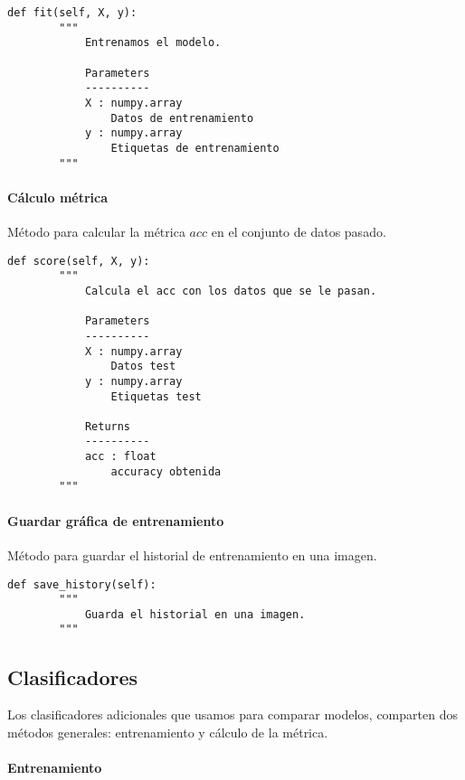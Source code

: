 \begin{lstlisting}
def fit(self, X, y):
        """
            Entrenamos el modelo.

            Parameters
            ----------
            X : numpy.array
                Datos de entrenamiento
            y : numpy.array
                Etiquetas de entrenamiento
        """
\end{lstlisting}

\paragraph{Cálculo métrica}

Método para calcular la métrica $acc$ en el conjunto de datos pasado.

\begin{lstlisting}
def score(self, X, y):
        """
            Calcula el acc con los datos que se le pasan.

            Parameters
            ----------
            X : numpy.array
                Datos test
            y : numpy.array
                Etiquetas test

            Returns
            ----------
            acc : float
                accuracy obtenida
        """
\end{lstlisting}

\paragraph{Guardar gráfica de entrenamiento}

Método para guardar el historial de entrenamiento en una imagen.

\begin{lstlisting}
def save_history(self):
        """
            Guarda el historial en una imagen.
        """
\end{lstlisting}

\subsection{Clasificadores}

Los clasificadores adicionales que usamos para comparar modelos, comparten dos métodos generales: entrenamiento y cálculo de la métrica.

\paragraph{Entrenamiento}

